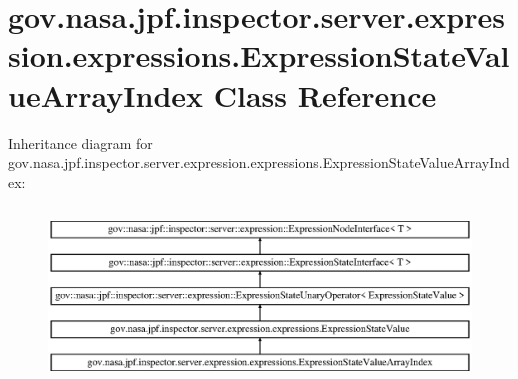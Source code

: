 \hypertarget{classgov_1_1nasa_1_1jpf_1_1inspector_1_1server_1_1expression_1_1expressions_1_1_expression_state_value_array_index}{}\section{gov.\+nasa.\+jpf.\+inspector.\+server.\+expression.\+expressions.\+Expression\+State\+Value\+Array\+Index Class Reference}
\label{classgov_1_1nasa_1_1jpf_1_1inspector_1_1server_1_1expression_1_1expressions_1_1_expression_state_value_array_index}
Inheritance diagram for gov.\+nasa.\+jpf.\+inspector.\+server.\+expression.\+expressions.\+Expression\+State\+Value\+Array\+Index\+:\begin{figure}[H]
\begin{center}
\leavevmode
\includegraphics[height=4.745763cm]{classgov_1_1nasa_1_1jpf_1_1inspector_1_1server_1_1expression_1_1expressions_1_1_expression_state_value_array_index}
\end{center}
\end{figure}
